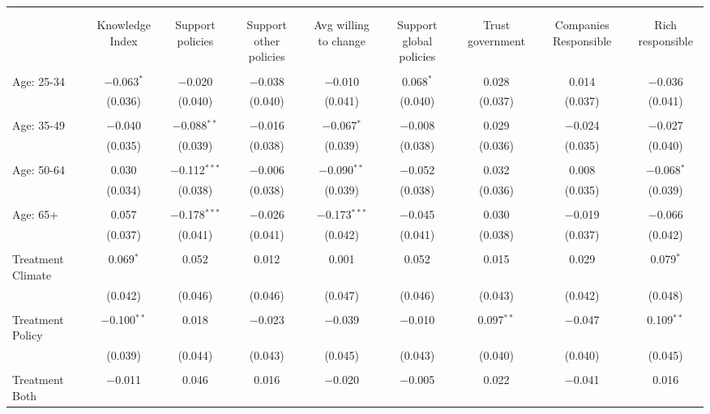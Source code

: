 
\begin{tabular}{@{\extracolsep{5pt}}lcccccccc} 
\\[-1.8ex]\hline 
\hline \\[-1.8ex] 
\\[-1.8ex] & Knowledge Index & Support policies & Support other policies & Avg willing to change & Support global policies & Trust government & Companies Responsible & Rich responsible \\ 
\hline \\[-1.8ex] 
 Age: 25-34 & $-$0.063$^{*}$ & $-$0.020 & $-$0.038 & $-$0.010 & 0.068$^{*}$ & 0.028 & 0.014 & $-$0.036 \\ 
  & (0.036) & (0.040) & (0.040) & (0.041) & (0.040) & (0.037) & (0.037) & (0.041) \\ 
  & & & & & & & & \\ 
 Age: 35-49 & $-$0.040 & $-$0.088$^{**}$ & $-$0.016 & $-$0.067$^{*}$ & $-$0.008 & 0.029 & $-$0.024 & $-$0.027 \\ 
  & (0.035) & (0.039) & (0.038) & (0.039) & (0.038) & (0.036) & (0.035) & (0.040) \\ 
  & & & & & & & & \\ 
 Age: 50-64 & 0.030 & $-$0.112$^{***}$ & $-$0.006 & $-$0.090$^{**}$ & $-$0.052 & 0.032 & 0.008 & $-$0.068$^{*}$ \\ 
  & (0.034) & (0.038) & (0.038) & (0.039) & (0.038) & (0.036) & (0.035) & (0.039) \\ 
  & & & & & & & & \\ 
 Age: 65+ & 0.057 & $-$0.178$^{***}$ & $-$0.026 & $-$0.173$^{***}$ & $-$0.045 & 0.030 & $-$0.019 & $-$0.066 \\ 
  & (0.037) & (0.041) & (0.041) & (0.042) & (0.041) & (0.038) & (0.037) & (0.042) \\ 
  & & & & & & & & \\ 
 Treatment Climate & 0.069$^{*}$ & 0.052 & 0.012 & 0.001 & 0.052 & 0.015 & 0.029 & 0.079$^{*}$ \\ 
  & (0.042) & (0.046) & (0.046) & (0.047) & (0.046) & (0.043) & (0.042) & (0.048) \\ 
  & & & & & & & & \\ 
 Treatment Policy & $-$0.100$^{**}$ & 0.018 & $-$0.023 & $-$0.039 & $-$0.010 & 0.097$^{**}$ & $-$0.047 & 0.109$^{**}$ \\ 
  & (0.039) & (0.044) & (0.043) & (0.045) & (0.043) & (0.040) & (0.040) & (0.045) \\ 
  & & & & & & & & \\ 
 Treatment Both & $-$0.011 & 0.046 & 0.016 & $-$0.020 & $-$0.005 & 0.022 & $-$0.041 & 0.016 \\ 

\end{tabular}
